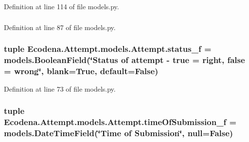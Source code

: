 Definition at line 114 of file models.py.

\hypertarget{class_ecodena_1_1_attempt_1_1models_1_1_attempt_aa0e8d9e10aa7d394777a8dcc138b67bf}{
\subsubsection[{status\_\-f}]{}}
\label{d5/da0/class_ecodena_1_1_attempt_1_1models_1_1_attempt_aa0e8d9e10aa7d394777a8dcc138b67bf}


Definition at line 87 of file models.py.

\hypertarget{class_ecodena_1_1_attempt_1_1models_1_1_attempt_a59ab4c46b6d8e82311f400a9f86398f3}{
\subsubsection[{status\_\-f}]{\setlength{\rightskip}{0pt plus 5cm}tuple {\bf Ecodena.Attempt.models.Attempt.status\_\-f} = models.BooleanField(\char`\"{}Status of attempt -\/ true = right, false = wrong\char`\"{}, blank=True, default=False)}}
\label{d5/da0/class_ecodena_1_1_attempt_1_1models_1_1_attempt_a59ab4c46b6d8e82311f400a9f86398f3}


Definition at line 73 of file models.py.

\hypertarget{class_ecodena_1_1_attempt_1_1models_1_1_attempt_ae384b3bf053f841002aa0232bccfafaa}{
\subsubsection[{timeOfSubmission\_\-f}]{\setlength{\rightskip}{0pt plus 5cm}tuple {\bf Ecodena.Attempt.models.Attempt.timeOfSubmission\_\-f} = models.DateTimeField(\char`\"{}Time of Submission\char`\"{}, null=False)}}
\label{d5/da0/class_ecodena_1_1_attempt_1_1models_1_1_attempt_ae384b3bf053f841002aa0232bccfafaa}



